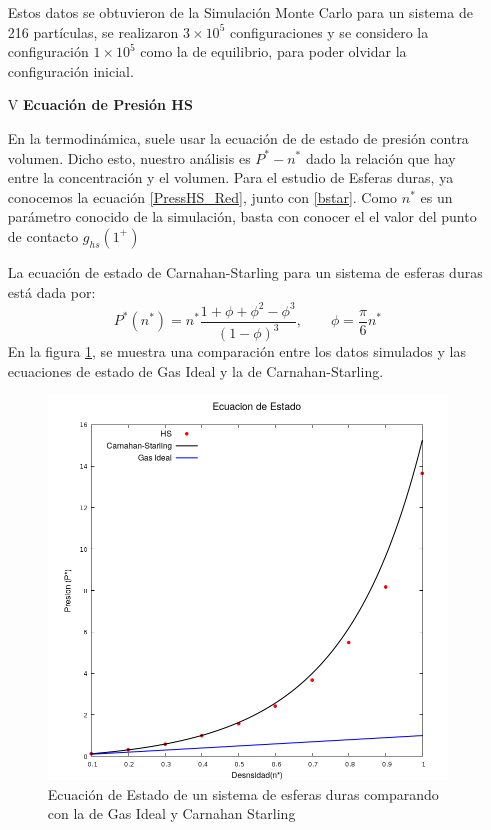 \documentclass[12pt,letterpaper]{article}
\begin{document}
\begin{enumerate}
 Estos datos se obtuvieron de la Simulación Monte Carlo para un sistema de 216 partículas, se realizaron $3\times10^5$ configuraciones y se considero la configuración $1\times10^5$ como la de equilibrio, para poder olvidar la configuración inicial.

\item[V]\textbf{Ecuación de Presión HS}

En la termodinámica, suele usar la ecuación de de estado de presión contra volumen. Dicho esto, nuestro análisis es $P^*-n^*$ dado la relación que hay entre la concentración y el volumen. Para el estudio de Esferas duras, ya conocemos la ecuación \eqref{PressHS_Red}, junto con \eqref{bstar}. Como $n^*$ es un parámetro conocido de la simulación, basta con conocer el el valor del punto de contacto $g_{hs}(1^+)$

La ecuación de estado de Carnahan-Starling para un sistema de esferas duras está dada por:
\begin{equation}
P^*(n^*) = n^* \frac{1+\phi+\phi^2-\phi^3}{(1-\phi)^3}, \qquad \phi=\frac{\pi}{6} n^*
\end{equation}
En la figura \ref{Fig:EcEstado}, se muestra una comparación entre los datos simulados y las ecuaciones de estado de Gas Ideal y la de Carnahan-Starling.
\begin{figure}[H]
	\centering
	\includegraphics[width=0.75\linewidth]{Comparativo.png}
\caption{Ecuación de Estado de un sistema de esferas duras comparando con la de Gas Ideal y Carnahan Starling}
\label{Fig:EcEstado}
\end{figure}


\end{enumerate}
\end{document}

